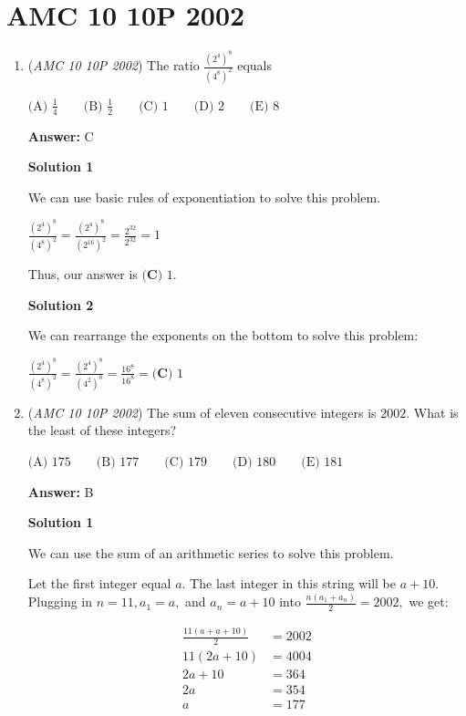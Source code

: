 \section{AMC 10 10P 2002}
        \begin{enumerate}
        	\item (\textit{AMC 10 10P 2002}) The ratio $\frac{(2^4)^8}{(4^8)^2}$ equals


 $\text{(A) }\frac{1}{4} \qquad \text{(B) }\frac{1}{2} \qquad \text{(C) }1 \qquad \text{(D) }2 \qquad \text{(E) }8$

 \textbf{Answer: }C



\textbf{Solution 1}

We can use basic rules of exponentiation to solve this problem.

 $\frac{(2^4)^8}{(4^8)^2}  =\frac{(2^4)^8}{(2^{16})^2}  =\frac{2^{32}}{2^{32}}  =1$

 Thus, our answer is $\boxed{\textbf{(C) } 1}.$




\textbf{Solution 2}

We can rearrange the exponents on the bottom to solve this problem:

 $\frac{(2^4)^8}{(4^8)^2}  =\frac{(2^4)^8}{(4^{2})^8}  =\frac{16^{8}}{16^{8}}  =\boxed{\textbf{(C) } 1}$



	\item (\textit{AMC 10 10P 2002}) The sum of eleven consecutive integers is $2002.$ What is the least of these integers?


 $\text{(A) }175 \qquad \text{(B) }177 \qquad \text{(C) }179 \qquad \text{(D) }180 \qquad \text{(E) }181$

 \textbf{Answer: }B



\textbf{Solution 1}

We can use the sum of an arithmetic series to solve this problem.

 Let the first integer equal $a.$ The last integer in this string will be $a+10.$ Plugging in $n=11, a_1=a,$ and $a_n=a+10$ into $\frac{n(a_1 + a_n)}{2}=2002,$ we get:

 \begin{align*}\frac{11(a + a+10)}{2}&=2002 \\11(2a+10)&=4004 \\2a+10&=364 \\2a&=354 \\a&=177\\\end{align*}



\end{enumerate}

